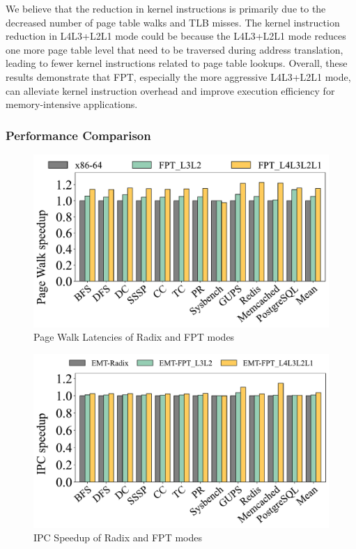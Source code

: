 We believe that the reduction in kernel instructions is primarily due to the decreased number of page table walks and TLB misses. The kernel instruction reduction in L4L3+L2L1 mode could be because the L4L3+L2L1 mode reduces one more page table level that need to be traversed during address translation, leading to fewer kernel instructions related to page table lookups. Overall, these results demonstrate that FPT, especially the more aggressive L4L3+L2L1 mode, can alleviate kernel instruction overhead and improve execution efficiency for memory-intensive applications.

\subsubsection{Performance Comparison}

\begin{figure}
    \centering
    \includegraphics[width=0.85\linewidth]{graph/fpt_pgwalk_unified_never.pdf}
    \caption{Page Walk Latencies of Radix and FPT modes}
    \label{fig:fptpgwalk}
\end{figure}

\begin{figure}
    \centering
    \includegraphics[width=0.85\linewidth]{graph/fpt_ipc_unified_never.pdf}
    \caption{IPC Speedup of Radix and FPT modes}
    \label{fig:fptipc}
\end{figure}

